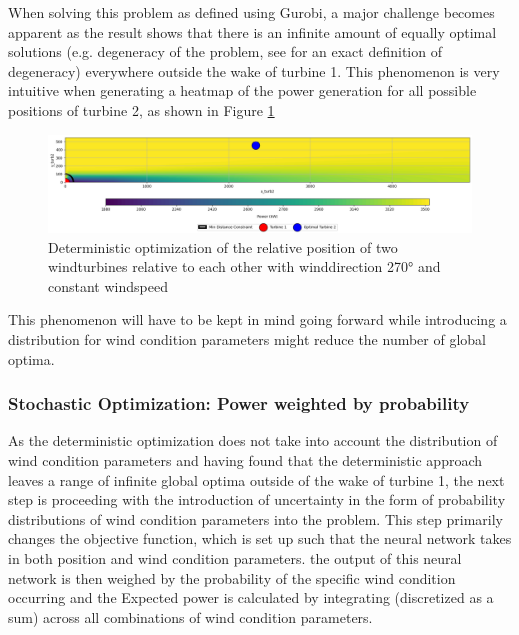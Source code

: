 When solving this problem as defined using Gurobi, a major challenge becomes apparent as the result shows that there is an infinite amount of equally optimal solutions (e.g. degeneracy of the problem, see  \cite{vanderbei2020chapter3} for an exact definition of degeneracy) everywhere outside the wake of turbine 1. This phenomenon is very intuitive when generating a heatmap of the power generation for all possible positions of turbine 2, as shown in Figure \ref{fig:two_turbine_heatmap_degeneracy}

\begin{figure}[h] 
	\centering
	\includegraphics[width=1\textwidth]{figures/optimization/opti_determ270.png} 
	\caption{Deterministic optimization of the relative position of two windturbines relative to each other with winddirection 270° and constant windspeed}
	\label{fig:two_turbine_heatmap_degeneracy}
\end{figure}

This phenomenon will have to be kept in mind going forward while introducing a distribution for wind condition parameters might reduce the number of global optima. 


\subsubsection{Stochastic Optimization:  Power weighted by probability}

As the deterministic optimization does not take into account the distribution of wind condition parameters and having found that the deterministic approach leaves a range of infinite global optima outside of the wake of turbine 1, the next step is proceeding with the introduction of uncertainty in the form of probability distributions of wind condition parameters into the problem. This step primarily changes the objective function, which is set up such that the neural network takes in both position and wind condition parameters. the output of this neural network is then weighed by the probability of the specific wind condition occurring and the Expected power is calculated by integrating (discretized as a sum) across all combinations of wind condition parameters.

